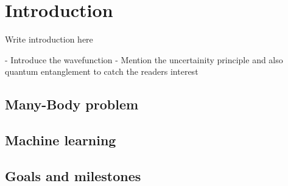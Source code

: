 \section{Introduction} \label{sec:introduction}
Write introduction here

 - Introduce the wavefunction
 - Mention the uncertainity principle and also quantum entanglement to catch the readers interest
 
\subsection{Many-Body problem} \label{subsec:manybodyproblem}

\subsection{Machine learning} \label{subsec:machinelearning}

\subsection{Goals and milestones} \label{subsec:goals}